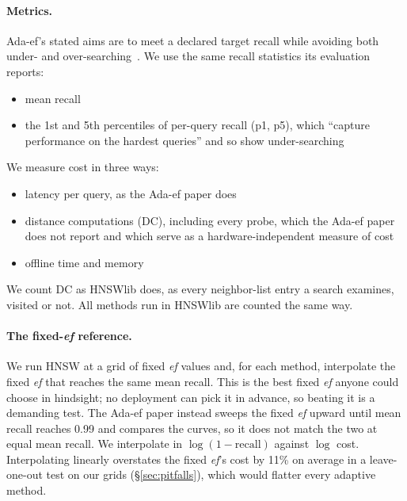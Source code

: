 \documentclass[sigconf,review=false,screen]{acmart}
\newcommand{\ef}{\textit{ef}}
\begin{document}
\paragraph{Metrics.}
Ada-ef's stated aims are to meet a declared target recall while avoiding both under- and
over-searching~\cite{zhang2026adaef}. We use the same recall statistics its evaluation reports:
\begin{itemize}
\item mean recall
\item the 1st and 5th percentiles of per-query recall (p1, p5), which ``capture performance on the
  hardest queries'' and so show under-searching~\cite[\S 7.2]{zhang2026adaef}
\end{itemize}
We measure cost in three ways:
\begin{itemize}
\item latency per query, as the Ada-ef paper does
\item distance computations (DC), including every probe, which the Ada-ef paper does not report and
  which serve as a hardware-independent measure of cost
\item offline time and memory
\end{itemize}
We count DC as HNSWlib does, as every neighbor-list entry a search examines, visited or not. All
methods run in HNSWlib are counted the same way.

\paragraph{The fixed-\ef{} reference.}
We run HNSW at a grid of fixed \ef{} values and, for each method, interpolate the fixed \ef{} that
reaches the same mean recall. This is the best fixed \ef{} anyone could choose in hindsight; no
deployment can pick it in advance, so beating it is a demanding test. The Ada-ef paper instead sweeps
the fixed \ef{} upward until mean recall reaches 0.99 and compares the curves, so it does not match
the two at equal mean recall. We interpolate in $\log(1 - \text{recall})$ against $\log$ cost.
Interpolating linearly overstates the fixed \ef{}'s cost by 11\% on average in a leave-one-out test
on our grids (\S\ref{sec:pitfalls}), which would flatter every adaptive method.

\begin{table}[t]
  \caption{Datasets, sorted by KS (200 queries). $\rho$: rank correlation between each score and
  the true per-query $\mathrm{ef}^*$ on the calibration set, settings P / R; the larger magnitude
  ranks queries better. A dash: the score is constant on the calibration queries.}
  \label{tab:datasets}
  \centering\footnotesize
  \resizebox{\linewidth}{!}{}
\end{table}
\end{document}
